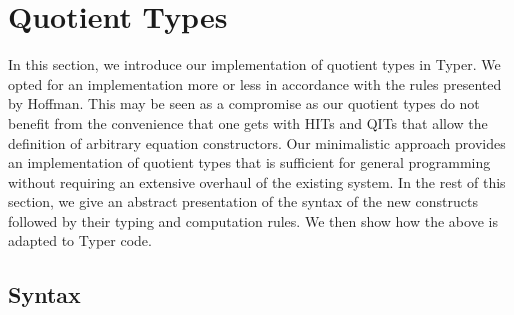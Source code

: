 \documentclass[12pt,twoside,maitrise]{dms}
\theoremstyle{definition}
\numberwithin{equation}{section}
\numberwithin{table}{chapter}
\numberwithin{figure}{chapter}
\newcommand\id[1] {\texttt{#1}}
\begin{document}





\section{Quotient Types}\label{sec:quot}

In this section, we introduce our implementation of quotient types in Typer. We
opted for an implementation more or less in accordance with the rules presented
by Hoffman\cite[Chap~5.1.5]{hofmann1995extensional}. This may be seen as a
compromise as our quotient types do not benefit from the convenience that one
gets with HITs and QITs that allow the definition of arbitrary equation
constructors. Our minimalistic approach provides an implementation of quotient
types that is sufficient for general programming without requiring an extensive
overhaul of the existing system. In the rest of this section, we give an
abstract presentation of the syntax of the new constructs followed by their
typing and computation rules. We then show how the above is adapted to Typer
code.

\subsection{Syntax}\label{sec:quot-syntax}
\end{document}

